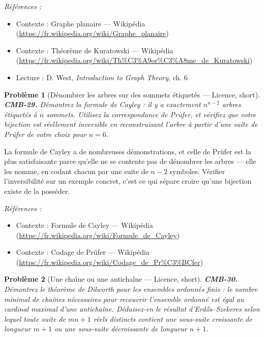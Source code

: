 \documentclass[11pt]{article}
\newtheorem{problem}{Problème}
\newenvironment{refs}{\par\small\noindent\emph{Références :}\begin{itemize}\setlength\itemsep{0pt}}{\end{itemize}\normalsize}
\begin{document}
\begin{refs}
\item Contexte : Graphe planaire --- Wikipédia (\url{https://fr.wikipedia.org/wiki/Graphe_planaire})
\item Contexte : Théorème de Kuratowski --- Wikipédia (\url{https://fr.wikipedia.org/wiki/Th%C3%A9or%C3%A8me_de_Kuratowski})
\item Lecture : D. West, \textit{Introduction to Graph Theory}, ch. 6
\end{refs}

\bigskip

\begin{problem}[{Dénombrer les arbres sur des sommets étiquetés --- Licence, short}]
\textbf{CMB-29.} Démontrez la formule de Cayley : il y a exactement $ n^{n-2} $ arbres étiquetés à $ n $ sommets. Utilisez la correspondance de Prüfer, et vérifiez que votre bijection est réellement inversible en reconstruisant l'arbre à partir d'une suite de Prüfer de votre choix pour $ n = 6 $.
\end{problem}

\noindent La formule de Cayley a de nombreuses démonstrations, et celle de Prüfer est la plus satisfaisante parce qu'elle ne se contente pas de dénombrer les arbres --- elle les nomme, en codant chacun par une suite de $ n-2 $ symboles. Vérifier l'inversibilité sur un exemple concret, c'est ce qui sépare croire qu'une bijection existe de la posséder.

\begin{refs}
\item Contexte : Formule de Cayley --- Wikipédia (\url{https://fr.wikipedia.org/wiki/Formule_de_Cayley})
\item Contexte : Codage de Prüfer --- Wikipédia (\url{https://fr.wikipedia.org/wiki/Codage_de_Pr%C3%BCfer})
\end{refs}

\bigskip

\begin{problem}[{Une chaîne ou une antichaîne --- Licence, short}]
\textbf{CMB-30.} Démontrez le théorème de Dilworth pour les ensembles ordonnés finis : le nombre minimal de chaînes nécessaires pour recouvrir l'ensemble ordonné est égal au cardinal maximal d'une antichaîne. Déduisez-en le résultat d'Erd\H{o}s--Szekeres selon lequel toute suite de $ mn+1 $ réels distincts contient une sous-suite croissante de longueur $ m+1 $ ou une sous-suite décroissante de longueur $ n+1 $.
\end{problem}
\end{document}
